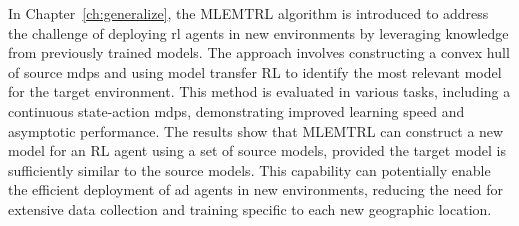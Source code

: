 In Chapter~\ref{ch:generalize}, the MLEMTRL algorithm is introduced to address the challenge of deploying \gls{rl} agents in new environments by leveraging knowledge from previously trained models. The approach involves constructing a convex hull of source \gls{mdp}s and using model transfer RL to identify the most relevant model for the target environment. This method is evaluated in various tasks, including a continuous state-action \gls{mdp}s, demonstrating improved learning speed and asymptotic performance.
The results show that MLEMTRL can construct a new model for an RL agent using a set of source models, provided the target model is sufficiently similar to the source models. This capability can potentially enable the efficient deployment of \gls{ad} agents in new environments, reducing the need for extensive data collection and training specific to each new geographic location.


